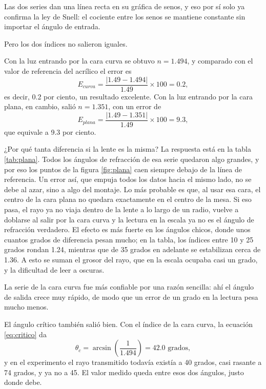 Las dos series dan una línea recta en su gráfica de senos, y eso por sí solo ya confirma la ley de Snell: el cociente entre los senos se mantiene constante sin importar el ángulo de entrada.

Pero los dos índices no salieron iguales.

Con la luz entrando por la cara curva se obtuvo $n = 1.494$, y comparado con el valor de referencia del acrílico el error es
\begin{equation}
E_{curva} = \frac{\left| 1.49 - 1.494 \right|}{1.49} \times 100 = 0.2 ,
\label{eq:error_curva}
\end{equation}
es decir, 0.2 por ciento, un resultado excelente. Con la luz entrando por la cara plana, en cambio, salió $n = 1.351$, con un error de
\begin{equation}
E_{plana} = \frac{\left| 1.49 - 1.351 \right|}{1.49} \times 100 = 9.3 ,
\label{eq:error_plana}
\end{equation}
que equivale a 9.3 por ciento.

¿Por qué tanta diferencia si la lente es la misma? La respuesta está en la tabla \ref{tab:plana}. Todos los ángulos de refracción de esa serie quedaron algo grandes, y por eso los puntos de la figura \ref{fig:plana} caen siempre debajo de la línea de referencia. Un error así, que empuja todos los datos hacia el mismo lado, no se debe al azar, sino a algo del montaje. Lo más probable es que, al usar esa cara, el centro de la cara plana no quedara exactamente en el centro de la mesa. Si eso pasa, el rayo ya no viaja dentro de la lente a lo largo de un radio, vuelve a doblarse al salir por la cara curva y la lectura en la escala ya no es el ángulo de refracción verdadero. El efecto es más fuerte en los ángulos chicos, donde unos cuantos grados de diferencia pesan mucho; en la tabla, los índices entre 10 y 25 grados rondan 1.24, mientras que de 35 grados en adelante se estabilizan cerca de 1.36. A esto se suman el grosor del rayo, que en la escala ocupaba casi un grado, y la dificultad de leer a oscuras.

La serie de la cara curva fue más confiable por una razón sencilla: ahí el ángulo de salida crece muy rápido, de modo que un error de un grado en la lectura pesa mucho menos.

El ángulo crítico también salió bien. Con el índice de la cara curva, la ecuación \eqref{eq:critico} da
\begin{equation}
\theta_c = \arcsin\left( \frac{1}{1.494} \right) = 42.0 \text{ grados},
\label{eq:critico_calc}
\end{equation}
y en el experimento el rayo transmitido todavía existía a 40 grados, casi rasante a 74 grados, y ya no a 45. El valor medido queda entre esos dos ángulos, justo donde debe.

